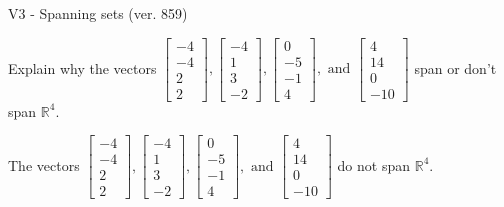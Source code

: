 \begin{exercise}
  \begin{exerciseTitle}V3 - Spanning sets (ver. 859)\end{exerciseTitle}
  \begin{exerciseStatement}
    Explain why the vectors \(\left[\begin{array}{r}
-4 \\
-4 \\
2 \\
2
\end{array}\right] , \left[\begin{array}{r}
-4 \\
1 \\
3 \\
-2
\end{array}\right] , \left[\begin{array}{r}
0 \\
-5 \\
-1 \\
4
\end{array}\right] , \text{ and } \left[\begin{array}{r}
4 \\
14 \\
0 \\
-10
\end{array}\right]\) span or don't span \(\mathbb{R}^4\). 
	


  \end{exerciseStatement}
  \begin{exerciseAnswer}
   The vectors \(\left[\begin{array}{r}
-4 \\
-4 \\
2 \\
2
\end{array}\right] , \left[\begin{array}{r}
-4 \\
1 \\
3 \\
-2
\end{array}\right] , \left[\begin{array}{r}
0 \\
-5 \\
-1 \\
4
\end{array}\right] , \text{ and } \left[\begin{array}{r}
4 \\
14 \\
0 \\
-10
\end{array}\right]\) 
  	 do not  
	span \(\mathbb{R}^4\).
  


  \end{exerciseAnswer}
\end{exercise}